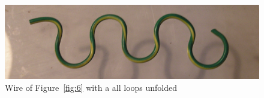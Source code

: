 %

\begin{figure}[!h]
  \centering
  \includegraphics[width=1.1\textwidth]{fig7.jpg}
  \caption{Wire of Figure~\ref{fig:6} with a all loops unfolded}
  \label{fig:7}
\end{figure}

%

